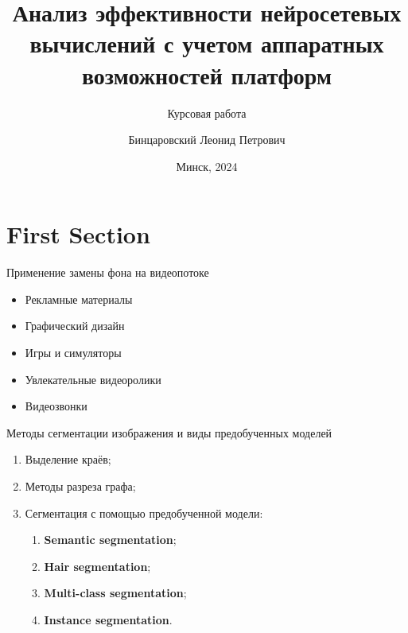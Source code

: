 \documentclass[aspectratio=169,xcolor=dvipsnames]{beamer}
\title{Анализ эффективности нейросетевых вычислений с учетом аппаратных возможностей платформ}
\subtitle{Курсовая работа}
\author[Pin-Yen] {Бинцаровский Леонид Петрович}
\institute[NTU] %
{
    Белорусский государственный университет\\
    ФПМИ, ДМА, 3 курс\\
    руководитель: старший преподаватель Пирштук Д. И.
    \vskip 3pt
}
\date{Минск, 2024} %
\begin{document}
\begin{frame}
    \titlepage
\end{frame}


\section{First Section}

\begin{frame}{Применение замены фона на видеопотоке}
    \begin{itemize}
        \item Рекламные материалы
        \item Графический дизайн
        \item Игры и симуляторы
        \item Увлекательные видеоролики
        \item Видеозвонки
    \end{itemize}
\end{frame}


\begin{frame}{Методы сегментации изображения и виды предобученных моделей}
    \begin{enumerate} 
      \item Выделение краёв;
      \item Методы разреза графа;
      \item Сегментация с помощью предобученной модели:
        \begin{enumerate} 
            \item \textbf{Semantic segmentation};
            \item \textbf{Hair segmentation};
            \item \textbf{Multi-class segmentation};
            \item \textbf{Instance segmentation}.
        \end{enumerate} 
    \end{enumerate}
\end{frame}
\end{document}
